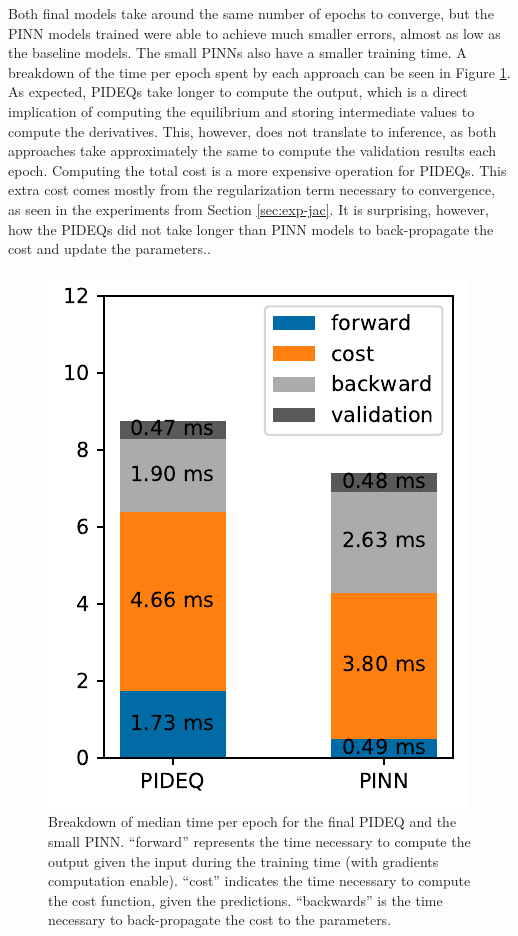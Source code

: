 Both final models take around the same number of epochs to converge, but the \gls{PINN} models trained were able to achieve much smaller errors, almost as low as the baseline models.
The small \glspl{PINN} also have a smaller training time.
A breakdown of the time per epoch spent by each approach can be seen in Figure \ref{fig:final-times}.
As expected, \glspl{PIDEQ} take longer to compute the output, which is a direct implication of computing the equilibrium and storing intermediate values to compute the derivatives.
This, however, does not translate to inference, as both approaches take approximately the same to compute the validation results each epoch.
Computing the total cost is a more expensive operation for \glspl{PIDEQ}.
This extra cost comes mostly from the regularization term necessary to convergence, as seen in the experiments from Section \ref{sec:exp-jac}.
It is surprising, however, how the \glspl{PIDEQ} did not take longer than \gls{PINN} models to back-propagate the cost and update the parameters..

\begin{figure}[h]
    \centering
    \includegraphics{images/final_times.pdf}
    \caption[Breakdown of median time per epoch for the final \gls{PIDEQ} and the small \gls{PINN}.]{Breakdown of median time per epoch for the final \gls{PIDEQ} and the small \gls{PINN}. ``forward'' represents the time necessary to compute the output given the input during the training time (with gradients computation enable). ``cost'' indicates the time necessary to compute the cost function, given the predictions. ``backwards'' is the time necessary to back-propagate the cost to the parameters.}
    \label{fig:final-times}
\end{figure}

